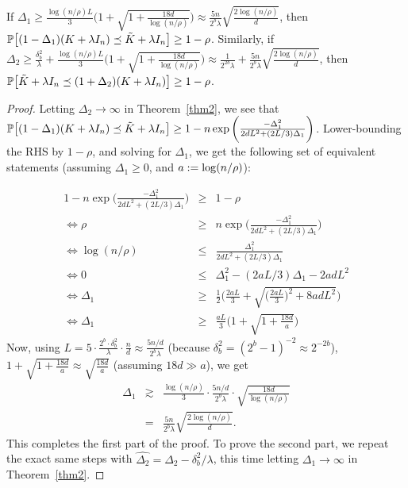 \documentclass[12pt]{article}
\begin{document}
\begin{corollary}
	If $\Delta_1 \geq \frac{\log(n/\rho)L}{3}\Big(1+\sqrt{1+\frac{18d}{\log(n/\rho)}}\Big) \approx \frac{5n}{2^b \lambda}\sqrt{\frac{2\log(n/\rho)}{d}}$,
	then $\Prob\big[(1 - \Delta_1) (K + \lambda I_n) \preceq \tK + \lambda I_n \big] \geq  1 - \rho$. 
	Similarly, if $\Delta_2 \geq \frac{\delta_b^2}{\lambda} +  \frac{\log(n/\rho)L}{3}\Big(1+\sqrt{1+\frac{18d}{\log(n/\rho)}}\Big) \approx \frac{1}{2^{2b}\lambda} + \frac{5n}{2^b \lambda}\sqrt{\frac{2\log(n/\rho)}{d}}$,
	then $\Prob\big[\tK + \lambda I_n \preceq (1 + \Delta_2) (K + \lambda I_n)\big] \geq  1 - \rho$. 
\end{corollary}

\begin{proof}
Letting $\Delta_2 \rightarrow \infty$ in Theorem~\ref{thm2}, we see that 
$\Prob\big[(1 - \Delta_1) (K + \lambda I_n) \preceq \tK + \lambda I_n \big] \geq 1 - n \exp \bigg(\frac{-\Delta_1^2}{2dL^2 + (2L/3)\Delta_1}\bigg)$.
Lower-bounding the RHS by $1-\rho$, and solving for $\Delta_1$, we get the following set of equivalent statements (assuming $\Delta_1 \geq 0$, and $a\defeq \log(n/\rho)$):

\begin{eqnarray*}
1 - n \exp \bigg(\frac{-\Delta_1^2}{2dL^2 + (2L/3)\Delta_1}\bigg) &\geq& 1-\rho \\
\Longleftrightarrow \rho &\geq& n \exp \bigg(\frac{-\Delta_1^2}{2dL^2 + (2L/3)\Delta_1}\bigg) \\
\Longleftrightarrow \log(n/\rho) &\leq& \frac{\Delta_1^2}{2dL^2 + (2L/3)\Delta_1} \\
\Longleftrightarrow 0 &\leq&  \Delta_1^2 - (2aL/3)\Delta_1 - 2adL^2 \\
\Longleftrightarrow \Delta_1 &\geq&  \frac{1}{2}\bigg(\frac{2aL}{3} + \sqrt{\Big(\frac{2aL}{3}\Big)^2 + 8adL^2}\bigg) \\
\Longleftrightarrow \Delta_1 &\geq& \frac{aL}{3}\bigg(1 + \sqrt{1 + \frac{18d}{a}}\bigg)
\end{eqnarray*}
Now, using $L = 5 \cdot \frac{2^b \cdot \delta_b^2}{\lambda}\cdot  \frac{n}{d} \approx \frac{5n/d}{2^b \lambda}$ (because $\delta_b^2 = (2^b-1)^{-2} \approx 2^{-2b}$), $1 + \sqrt{1 + \frac{18d}{a}} \approx \sqrt{\frac{18d}{a}}$ (assuming $18d \gg a$), we get
\begin{eqnarray*}
	\Delta_1 &\gtrsim& \frac{\log(n/\rho)}{3}\cdot \frac{5n/d}{2^b \lambda}\cdot \sqrt{\frac{18d}{\log(n/\rho)}} \\
	&=& \frac{5n}{2^b \lambda}\sqrt{\frac{2\log(n/\rho)}{d}}.
\end{eqnarray*}
This completes the first part of the proof.
To prove the second part, we repeat the exact same steps with $\widehat{\Delta_2} = \Delta_2 - \delta_b^2/\lambda$, this time letting $\Delta_1 \rightarrow \infty$ in Theorem~\ref{thm2}.

\end{proof}
\end{document}
